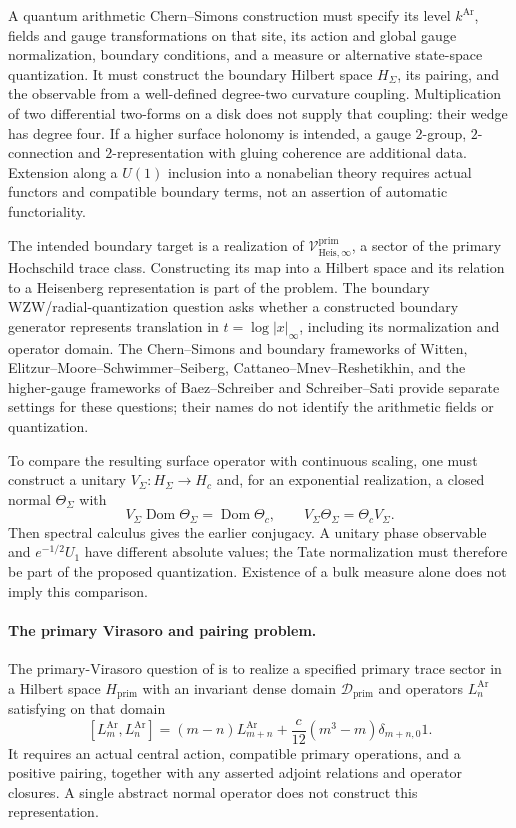 A quantum arithmetic Chern--Simons construction must specify its
level $k^{\mathrm{Ar}}$, fields and gauge transformations on that site,
its action and global gauge normalization, boundary conditions,
and a measure or alternative state-space quantization. It must
construct the boundary Hilbert space $H_\Sigma$, its pairing,
and the observable from a well-defined degree-two curvature
coupling. Multiplication of two differential two-forms on a disk
does not supply that coupling: their wedge has degree four.
If a higher surface holonomy is intended, a gauge $2$-group,
$2$-connection and $2$-representation with gluing coherence are
additional data. Extension along a $U(1)$ inclusion into a
nonabelian theory requires actual functors and compatible boundary
terms, not an assertion of automatic functoriality.

The intended boundary target is a realization of
$\mathcal V^{\mathrm{prim}}_{\mathrm{Heis},\infty}$, a sector of the
primary Hochschild trace class. Constructing its map into a Hilbert
space and its relation to a Heisenberg representation is part of
the problem. The boundary WZW/radial-quantization question asks
whether a constructed boundary generator represents translation
in $t=\log|x|_\infty$, including its normalization and operator domain.
The Chern--Simons and boundary frameworks of Witten,
Elitzur--Moore--Schwimmer--Seiberg, Cattaneo--Mnev--Reshetikhin,
and the higher-gauge frameworks of Baez--Schreiber and Schreiber--Sati
provide separate settings for these questions; their names do not
identify the arithmetic fields or quantization.

To compare the resulting surface operator with continuous scaling,
one must construct a unitary $V_\Sigma:H_\Sigma\to H_c$ and, for
an exponential realization, a closed normal $\Theta_\Sigma$ with
\[
 V_\Sigma\operatorname{Dom}\Theta_\Sigma=\operatorname{Dom}\Theta_c,
 \qquad V_\Sigma\Theta_\Sigma=\Theta_cV_\Sigma.
\]
Then spectral calculus gives the earlier conjugacy. A unitary phase
observable and $e^{-1/2}U_1$ have different absolute values; the Tate
normalization must therefore be part of the proposed quantization.
Existence of a bulk measure alone does not imply this comparison.

\paragraph{The primary Virasoro and pairing problem.}
\label{v4-arith:pres90:primary-virasoro}
The primary-Virasoro question of
 is to realize a specified
primary trace sector in a Hilbert space $H_{\mathrm{prim}}$ with
an invariant dense domain $\mathcal D_{\mathrm{prim}}$ and operators
$L_n^{\mathrm{Ar}}$ satisfying on that domain
\[
 [L_m^{\mathrm{Ar}},L_n^{\mathrm{Ar}}]
 =(m-n)L_{m+n}^{\mathrm{Ar}}
   +\frac{c}{12}(m^3-m)\delta_{m+n,0}1.
\]
It requires an actual central action, compatible primary operations,
and a positive pairing, together with any asserted adjoint relations
and operator closures. A single abstract normal operator does not
construct this representation.

